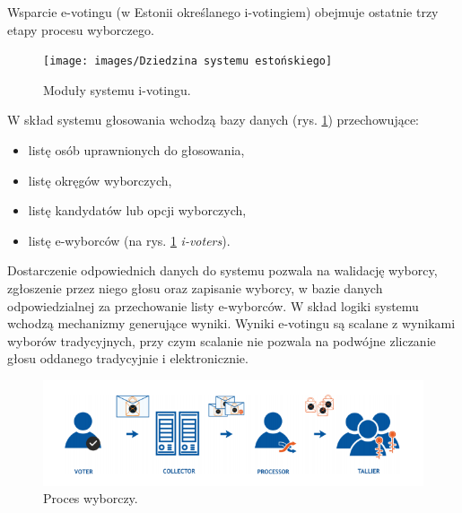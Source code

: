 \documentclass[a4paper,12pt]{book}
\begin{document}
Wsparcie e-votingu (w Estonii określanego i-votingiem) obejmuje ostatnie trzy etapy procesu wyborczego.

\begin{figure}[h]
	\centering
	\texttt{[image: images/Dziedzina systemu estońskiego]}
	\caption{Moduły systemu i-votingu. \cite{estonian:voting}}\label{estmodules}
\end {figure}
\newpage

W skład systemu głosowania wchodzą bazy danych (rys. \ref{estmodules}) przechowujące:
\begin{itemize}
\item listę osób uprawnionych do głosowania,
\item listę okręgów wyborczych,
\item listę kandydatów lub opcji wyborczych,
\item listę e-wyborców (na rys. \ref{estmodules} \textit{i-voters}).
\end{itemize}

Dostarczenie odpowiednich danych do systemu pozwala na walidację wyborcy, zgłoszenie przez
niego głosu oraz zapisanie wyborcy, w bazie danych odpowiedzialnej za przechowanie listy e-wyborców. W skład logiki systemu wchodzą mechanizmy generujące wyniki. Wyniki e-votingu są scalane z wynikami wyborów tradycyjnych, przy czym scalanie nie pozwala na podwójne zliczanie głosu oddanego tradycyjnie i elektronicznie.

\begin{figure}[h]
	\centering
	\includegraphics[width=\textwidth]{images/Główne częsci systemu estońskiego.png}
	\caption{Proces wyborczy. \cite{estonian:voting}}\label{estprocess}
\end {figure}
\end{document}
